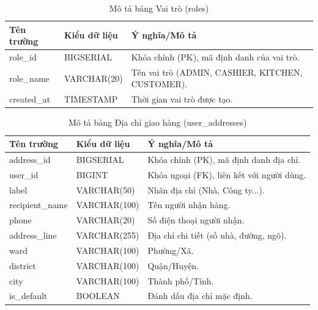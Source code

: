 \documentclass[../20232006p.tex]{subfiles}
\begin{document}
\begin{table}[H]
    \centering
    \caption{Mô tả bảng Vai trò (roles)}
    \label{tab:roles}
    \begin{tabular}{|p{3cm}|p{3cm}|p{8cm}|}
        \hline
        \textbf{Tên trường} & \textbf{Kiểu dữ liệu} & \textbf{Ý nghĩa/Mô tả}                           \\
        \hline
        role\_id            & BIGSERIAL             & Khóa chính (PK), mã định danh của vai trò.       \\
        \hline
        role\_name          & VARCHAR(20)           & Tên vai trò (ADMIN, CASHIER, KITCHEN, CUSTOMER). \\
        \hline
        created\_at         & TIMESTAMP             & Thời gian vai trò được tạo.                      \\
        \hline
    \end{tabular}
\end{table}

\begin{table}[H]
    \centering
    \caption{Mô tả bảng Địa chỉ giao hàng (user\_addresses)}
    \label{tab:user_addresses}
    \begin{tabular}{|p{3.5cm}|p{3cm}|p{7.5cm}|}
        \hline
        \textbf{Tên trường} & \textbf{Kiểu dữ liệu} & \textbf{Ý nghĩa/Mô tả}                    \\
        \hline
        address\_id         & BIGSERIAL             & Khóa chính (PK), mã định danh địa chỉ.    \\
        \hline
        user\_id            & BIGINT                & Khóa ngoại (FK), liên kết với người dùng. \\
        \hline
        label               & VARCHAR(50)           & Nhãn địa chỉ (Nhà, Công ty...).           \\
        \hline
        recipient\_name     & VARCHAR(100)          & Tên người nhận hàng.                      \\
        \hline
        phone               & VARCHAR(20)           & Số điện thoại người nhận.                 \\
        \hline
        address\_line       & VARCHAR(255)          & Địa chỉ chi tiết (số nhà, đường, ngõ).    \\
        \hline
        ward                & VARCHAR(100)          & Phường/Xã.                                \\
        \hline
        district            & VARCHAR(100)          & Quận/Huyện.                               \\
        \hline
        city                & VARCHAR(100)          & Thành phố/Tỉnh.                           \\
        \hline
        is\_default         & BOOLEAN               & Đánh dấu địa chỉ mặc định.                \\
        \hline
    \end{tabular}
\end{table}
\end{document}
